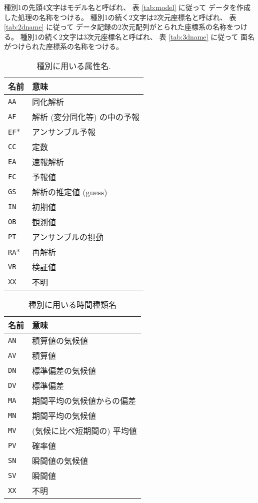 種別1の先頭4文字はモデル名と呼ばれ、
表 \ref{tab:model} に従って
データを作成した処理の名称をつける。
種別1の続く2文字は2次元座標名と呼ばれ、
表 \ref{tab:2dname} に従って
データ記録の2次元配列がとられた座標系の名称をつける。
種別1の続く2文字は3次元座標名と呼ばれ、
表 \ref{tab:3dname} に従って
面名がつけられた座標系の名称をつける。

\begin{table}[htp]
\begin{center}
\begin{tabular}{l|l}
\hline
名前 & 意味 \\
\hline
{\tt AA} & 同化解析 \\
{\tt AF} & 解析 (変分同化等) の中の予報 \\
{\tt EF}* & アンサンブル予報 \\
{\tt CC} & 定数 \\
{\tt EA} & 速報解析 \\
{\tt FC} & 予報値 \\
{\tt GS} & 解析の推定値 (guess) \\
{\tt IN} & 初期値 \\
{\tt OB} & 観測値 \\
{\tt PT} & アンサンブルの摂動 \\
{\tt RA}* & 再解析 \\
{\tt VR} & 検証値 \\
{\tt XX} & 不明 \\
\hline
\end{tabular}
\caption{種別に用いる属性名.}
\label{tab:attribute}
\end{center}
\end{table}

\begin{table}[htp]
\begin{center}
\begin{tabular}{l|l}
\hline
名前 & 意味 \\
\hline
{\tt AN} & 積算値の気候値 \\
{\tt AV} & 積算値 \\
{\tt DN} & 標準偏差の気候値 \\
{\tt DV} & 標準偏差 \\
{\tt MA} & 期間平均の気候値からの偏差 \\
{\tt MN} & 期間平均の気候値 \\
{\tt MV} & (気候に比べ短期間の) 平均値 \\
{\tt PV} & 確率値 \\
{\tt SN} & 瞬間値の気候値 \\
{\tt SV} & 瞬間値 \\
{\tt XX} & 不明 \\
\hline
\end{tabular}
\caption{種別に用いる時間種類名}
\label{tab:time}
\end{center}
\end{table}

